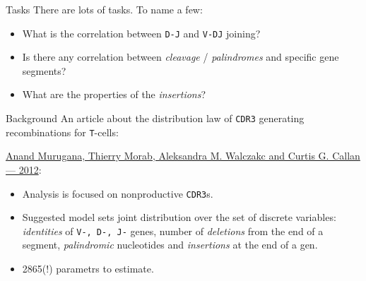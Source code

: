 \documentclass{beamer}\usepackage[]{graphicx}\usepackage[]{color}
\begin{document}
%  

\begin{frame}{Tasks}
  There are lots of tasks. To name a few:
  \begin{itemize}
    \item What is the correlation between \texttt{D-J} and \texttt{V-DJ} joining?
    \item Is there any correlation between \textit{cleavage} / \textit{palindromes} and specific gene segments?  
    \item What are the properties of the \textit{insertions}?
  \end{itemize}
\end{frame}

\begin{frame}{Background}
  An article about the distribution law of \texttt{CDR3} generating recombinations for \texttt{T}-cells:
  
  \href{http://www.pnas.org/content/109/40/16161.full}{%
  Anand Murugana, Thierry Morab, Aleksandra M. Walczakc and Curtis G. Callan --- 2012}:
  \begin{itemize}
    \item Analysis is focused on nonproductive \texttt{CDR3}s.
    \item Suggested model sets joint distribution over the set of discrete variables: \textit{identities} of \texttt{V-, D-, J-} genes, number of \textit{deletions} from the end of a segment, \textit{palindromic} nucleotides and \textit{insertions} at the end of a gen.
    \pause
  \item {\color{blue} 2865(!) parametrs to estimate.}
  \end{itemize}
\end{frame}
\end{document}
